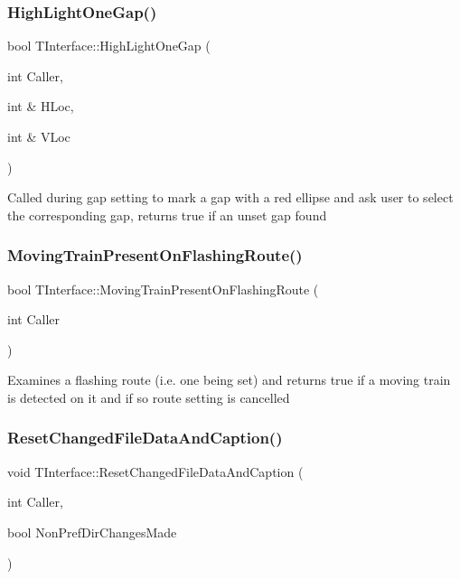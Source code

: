 \subsubsection{\texorpdfstring{High\+Light\+One\+Gap()}{HighLightOneGap()}}
{\footnotesize\ttfamily bool T\+Interface\+::\+High\+Light\+One\+Gap (\begin{DoxyParamCaption}\item[{int}]{Caller,  }\item[{int \&}]{H\+Loc,  }\item[{int \&}]{V\+Loc }\end{DoxyParamCaption})\hspace{0.3cm}{\ttfamily [private]}}

Called during gap setting to mark a gap with a red ellipse and ask user to select the corresponding gap, returns true if an unset gap found \mbox{\label{class_t_interface_a1cd9f01bcbcc37fb31712b7007d04dac}} 
\subsubsection{\texorpdfstring{Moving\+Train\+Present\+On\+Flashing\+Route()}{MovingTrainPresentOnFlashingRoute()}}
{\footnotesize\ttfamily bool T\+Interface\+::\+Moving\+Train\+Present\+On\+Flashing\+Route (\begin{DoxyParamCaption}\item[{int}]{Caller }\end{DoxyParamCaption})\hspace{0.3cm}{\ttfamily [private]}}

Examines a flashing route (i.\+e. one being set) and returns true if a moving train is detected on it and if so route setting is cancelled \mbox{\label{class_t_interface_a397ecca8b2fb1f85b265938a4e565de4}} 
\subsubsection{\texorpdfstring{Reset\+Changed\+File\+Data\+And\+Caption()}{ResetChangedFileDataAndCaption()}}
{\footnotesize\ttfamily void T\+Interface\+::\+Reset\+Changed\+File\+Data\+And\+Caption (\begin{DoxyParamCaption}\item[{int}]{Caller,  }\item[{bool}]{Non\+Pref\+Dir\+Changes\+Made }\end{DoxyParamCaption})\hspace{0.3cm}{\ttfamily [private]}}

